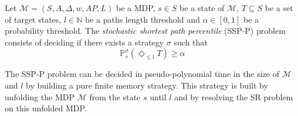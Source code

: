 \begin{definition}
  Let $\mathcal{M} = (S, A, \Delta, w, AP, L)$ be a MDP, $s \in S$ be a state of
  $\mathcal{M}$, $T \subseteq S$ be a set of target states, $l \in \mathbb{N}$
  be a paths length threshold and $\alpha \in [0, 1]$ be a probability
  threshold. The \textit{stochastic shortest path percentile} (SSP-P) problem
  consists of deciding if there exists a strategy $\sigma$ such that
  \[
    \mathbb{P}_s^\sigma (\Diamond_{\leq l} T) \geq \alpha
  \]
\end{definition}

\begin{theorem}
  The SSP-P problem can be decided in pseudo-polynomial time in the size of $\mathcal{M}$ and $l$ by building a pure finite memory strategy. This strategy is built by unfolding the MDP $\mathcal{M}$ from the state $s$ until $l$ and by resolving the SR problem on this unfolded MDP.
\end{theorem}


